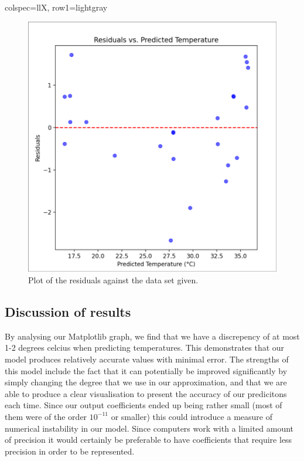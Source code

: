 \documentclass[11pt]{article}
\begin{document}
\begin{longtblr}[
  caption={Variables and parameters.}
]{
  colspec={llX},
  row{1}={lightgray}
}
\begin{center}
\begin{figure}[H]
  \centering
  \includegraphics[scale=0.3]{Images/Q1.png}
  \caption{Plot of the residuals against the data set given.}
\end{figure}
\end{center}

\subsection{Discussion of results}

By analysing our Matplotlib graph, we find that we have a discrepency of at most 1-2 degrees celcius when predicting
temperatures. This demonstrates that our model produces relatively accurate values with minimal error. The strengths of this
model include the fact that it can potentially be improved significantly by simply changing the degree that we use in our
approximation, and that we are able to produce a clear visualisation to present the accuracy of our predicitons each time.
Since our output coefficients ended up being rather small (most of them were of the order $10^{-11}$ or smaller) this could
introduce a measure of numerical instability in our model. Since computers work with a limited amount of precision it would
certainly be preferable to have coefficients that require less precision in order to be represented.


\end{longtblr}
\end{document}
